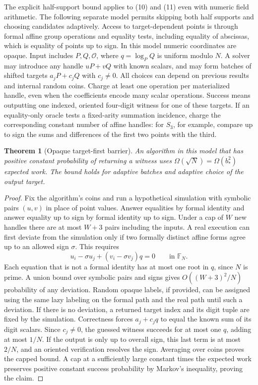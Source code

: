 \documentclass[11pt]{article}
\newtheorem{theorem}{Theorem}
\newcommand{\OO}{\mathcal O}
\begin{document}
The explicit half-support bound applies to (10) and (11) even with numeric field arithmetic. The following separate model permits skipping both half supports and choosing candidates adaptively. Access to target-dependent points is through formal affine group operations and equality tests, including equality of abscissas, which is equality of points up to sign. In this model numeric coordinates are opaque. Input includes \(P,Q,\OO\), where \(q=\log_PQ\) is uniform modulo \(N\). A solver may introduce any handle \(uP+vQ\) with known scalars, and may form batches of shifted targets \(a_jP+c_jQ\) with \(c_j\ne0\). All choices can depend on previous results and internal random coins. Charge at least one operation per materialized handle, even when the coefficients encode many scalar operations. Success means outputting one indexed, oriented four-digit witness for one of these targets. If an equality-only oracle tests a fixed-arity summation incidence, charge the corresponding constant number of affine handles: for \(S_3\), for example, compare up to sign the sums and differences of the first two points with the third.

\begin{theorem}[Opaque target-first barrier]
An algorithm in this model that has positive constant probability of returning a witness uses \(\Omega(\sqrt N)=\Omega(b_*^2)\) expected work. The bound holds for adaptive batches and adaptive choice of the output target.
\end{theorem}
\begin{proof}
Fix the algorithm's coins and run a hypothetical simulation with symbolic pairs \((u,v)\) in place of point values. Answer equalities by formal identity and answer equality up to sign by formal identity up to sign. Under a cap of \(W\) new handles there are at most \(W+3\) pairs including the inputs. A real execution can first deviate from the simulation only if two formally distinct affine forms agree up to an allowed sign \(\sigma\). This requires
\[
     u_i-\sigma u_j+(v_i-\sigma v_j)q=0
     \qquad\text{in }\mathbb F_N .
\]
Each equation that is not a formal identity has at most one root in \(q\), since \(N\) is prime. A union bound over symbolic pairs and signs gives \(O((W+3)^2/N)\) probability of any deviation. Random opaque labels, if provided, can be assigned using the same lazy labeling on the formal path and the real path until such a deviation. If there is no deviation, a returned target index and its digit tuple are fixed by the simulation. Correctness forces \(a_j+c_jq\) to equal the known sum of its digit scalars. Since \(c_j\ne0\), the guessed witness succeeds for at most one \(q\), adding at most \(1/N\). If the output is only up to overall sign, this last term is at most \(2/N\), and an oriented verification resolves the sign. Averaging over coins proves the capped bound. A cap at a sufficiently large constant times the expected work preserves positive constant success probability by Markov's inequality, proving the claim.
\end{proof}
\end{document}
